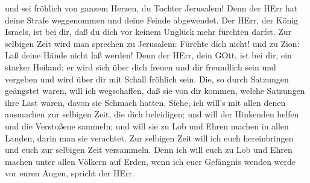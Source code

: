 und sei fröhlich von ganzem Herzen, du Tochter Jerusalem! 
Denn der HErr hat deine Strafe weggenommen und deine Feinde abgewendet.
Der HErr, der König Israels, ist bei dir, daß du dich vor keinem Unglück
mehr fürchten darfst.  Zur selbigen Zeit wird man sprechen
zu Jerusalem: Fürchte dich nicht! und zu Zion: Laß deine Hände nicht laß
werden!  Denn der HErr, dein GOtt, ist bei dir, ein starker
Heiland; er wird sich über dich freuen und dir freundlich sein und
vergeben und wird über dir mit Schall fröhlich sein.  Die,
so durch Satzungen geängstet waren, will ich wegschaffen, daß sie von
dir kommen, welche Satzungen ihre Last waren, davon sie Schmach hatten.
 Siehe, ich will's mit allen denen ausmachen zur selbigen
Zeit, die dich beleidigen; und will der Hinkenden helfen und die
Verstoßene sammeln; und will sie zu Lob und Ehren machen in allen
Landen, darin man sie verachtet.  Zur selbigen Zeit will
ich euch hereinbringen und euch zur selbigen Zeit versammeln. Denn ich
will euch zu Lob und Ehren machen unter allen Völkern auf Erden, wenn
ich euer Gefängnis wenden werde vor euren Augen, spricht der HErr.
